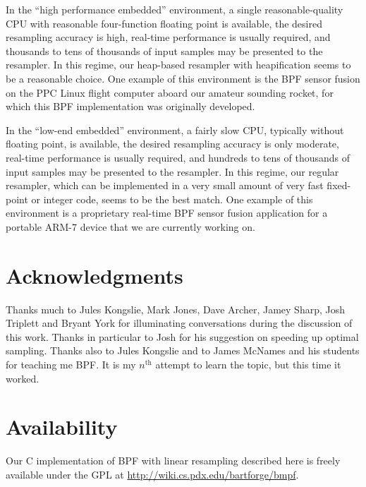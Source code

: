 \documentclass[12pt]{article}
\begin{document}
  In the ``high performance embedded'' environment, a single
  reasonable-quality CPU with reasonable four-function
  floating point is available, the desired resampling
  accuracy is high, real-time performance is usually
  required, and thousands to tens of thousands of input
  samples may be presented to the resampler.  In this
  regime, our heap-based resampler with heapification seems
  to be a reasonable choice.  One example of this
  environment is the BPF sensor fusion on the PPC Linux
  flight computer aboard our amateur sounding rocket, for
  which this BPF implementation was originally developed.

  In the ``low-end embedded'' environment, a fairly slow
  CPU, typically without floating point, is available, the
  desired resampling accuracy is only moderate, real-time
  performance is usually required, and hundreds to tens of
  thousands of input samples may be presented to the
  resampler.  In this regime, our regular resampler, which
  can be implemented in a very small amount of very fast
  fixed-point or integer code, seems to be the best match.
  One example of this environment is a proprietary real-time
  BPF sensor fusion application for a portable ARM-7 device
  that we are currently working on.

\section*{Acknowledgments}

  Thanks much to Jules Kongslie, Mark Jones, Dave Archer,
  Jamey Sharp, Josh Triplett and Bryant York for
  illuminating conversations during the discussion of this
  work.  Thanks in particular to Josh for his suggestion on
  speeding up optimal sampling.  Thanks also to Jules
  Kongslie and to James McNames and his students for
  teaching me BPF.  It is my $n^{\text{th}}$ attempt to
  learn the topic, but this time it worked.

\section*{Availability}

  Our C implementation of BPF with linear resampling
  described here is freely available under the GPL at
  \url{http://wiki.cs.pdx.edu/bartforge/bmpf}.



\end{document}
